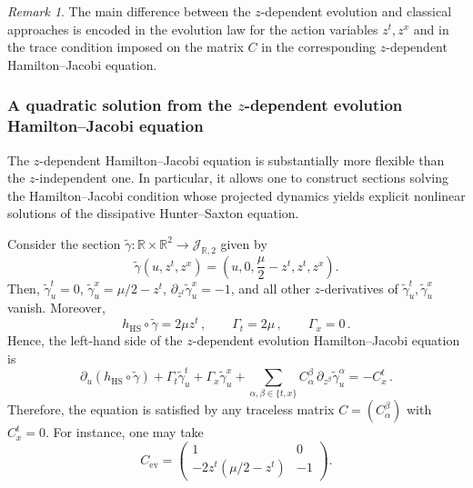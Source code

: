 \documentclass[11pt,twoside]{article}
\theoremstyle{plain}
\theoremstyle{definition}
\theoremstyle{remark}
\newtheorem{remark}[theorem]{Remark}
\begin{document}
\begin{remark}
The main difference between the $z$-dependent evolution and classical approaches is   encoded in the evolution law for the action variables $z^t,z^x$ and in the trace condition imposed on the matrix $C$ in the corresponding $z$-dependent Hamilton--Jacobi equation.
\end{remark}




\subsubsection{A quadratic solution from the \texorpdfstring{$z$}{}-dependent evolution Hamilton--Jacobi equation}

The $z$-dependent Hamilton--Jacobi equation is substantially more flexible than the $z$-independent one. In particular, it allows one to construct sections solving the Hamilton--Jacobi condition whose projected dynamics yields explicit nonlinear solutions of the dissipative Hunter--Saxton equation.

Consider the section $\widetilde{\gamma}:\mathbb{R}\times\mathbb{R}^2\to \mathcal{J}_{\mathbb{R},2}$ given by
\[
\widetilde{\gamma}(u,z^t,z^x)=\left(u,0,\frac{\mu}{2}-z^t,z^t,z^x\right).
\]
Then, $\widetilde{\gamma}_u^t=0$, $\widetilde{\gamma}_u^x=\mu/2-z^t$, $\partial_{z^t}\widetilde{\gamma}_u^x=-1$, and all other $z$-derivatives of $\widetilde{\gamma}_u^t,\widetilde{\gamma}_u^x$ vanish. Moreover,
\[
h_{\mathrm{HS}}\circ\widetilde{\gamma}=2\mu z^t\,,\qquad \Gamma_t=2\mu\,,\qquad \Gamma_x=0\,.
\]
Hence, the left-hand side of the $z$-dependent evolution Hamilton--Jacobi equation is
\[
\partial_u(h_{\mathrm{HS}}\circ\widetilde{\gamma})+\Gamma_t\widetilde{\gamma}_u^t+\Gamma_x\widetilde{\gamma}_u^x+\sum_{\alpha,\beta\in\{t,x\}}C^\beta_\alpha\,\partial_{z^\beta}\widetilde{\gamma}_u^\alpha=-C^t_x\,.
\]
Therefore, the equation is satisfied by any traceless matrix $C=(C^\beta_\alpha)$ with $C^t_x=0$. For instance, one may take
\[
C_{\mathrm{ev}}=
\begin{pmatrix}
1 & 0\\
-2z^t(\mu/2-z^t) & -1
\end{pmatrix}.
\]
\end{document}
